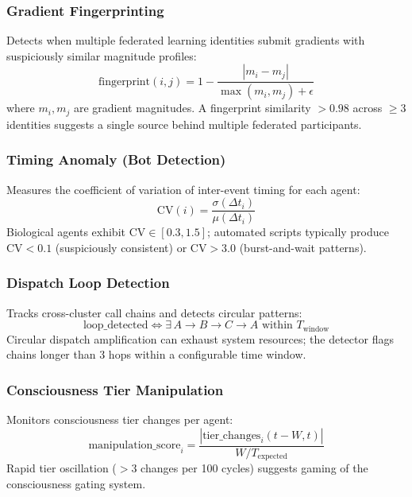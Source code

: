 \documentclass[11pt,a4paper]{article}
\begin{document}
\subsubsection{Gradient Fingerprinting}

Detects when multiple federated learning identities submit gradients with suspiciously similar magnitude profiles:
\begin{equation}
\text{fingerprint}(i, j) = 1 - \frac{|m_i - m_j|}{\max(m_i, m_j) + \epsilon}
\end{equation}
where $m_i, m_j$ are gradient magnitudes. A fingerprint similarity $> 0.98$ across $\geq 3$ identities suggests a single source behind multiple federated participants.

\subsubsection{Timing Anomaly (Bot Detection)}

Measures the coefficient of variation of inter-event timing for each agent:
\begin{equation}
\text{CV}(i) = \frac{\sigma(\Delta t_i)}{\mu(\Delta t_i)}
\end{equation}
Biological agents exhibit $\text{CV} \in [0.3, 1.5]$; automated scripts typically produce $\text{CV} < 0.1$ (suspiciously consistent) or $\text{CV} > 3.0$ (burst-and-wait patterns).

\subsubsection{Dispatch Loop Detection}

Tracks cross-cluster call chains and detects circular patterns:
\begin{equation}
\text{loop\_detected} \iff \exists\, A \to B \to C \to A \text{ within } T_{\text{window}}
\end{equation}
Circular dispatch amplification can exhaust system resources; the detector flags chains longer than 3 hops within a configurable time window.

\subsubsection{Consciousness Tier Manipulation}

Monitors consciousness tier changes per agent:
\begin{equation}
\text{manipulation\_score}_i = \frac{|\text{tier\_changes}_i(t - W, t)|}{W / T_{\text{expected}}}
\end{equation}
Rapid tier oscillation ($> 3$ changes per 100 cycles) suggests gaming of the consciousness gating system.
\end{document}
